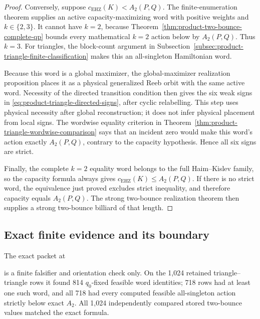 \begin{unverified}
\begin{proof}
Conversely, suppose \(c_{\mathrm{EHZ}}(K)<A_2(P,Q)\).  The finite-enumeration
theorem supplies an active capacity-maximizing word with positive weights and
\(k\in\{2,3\}\).  It cannot have \(k=2\), because
Theorem~\ref{thm:product-two-bounce-complete-qp} bounds every mathematical
\(k=2\) action below by \(A_2(P,Q)\).  Thus \(k=3\).  For triangles, the
block-count argument in
Subsection~\ref{subsec:product-triangle-finite-classification} makes this an
all-singleton Hamiltonian word.

Because this word is a global maximizer, the global-maximizer realization
proposition places it as a physical generalized Reeb orbit with the same
active word.  Necessity of the directed transition condition then gives the
six weak signs in \eqref{eq:product-triangle-directed-signs}, after cyclic
relabelling.  This step uses physical necessity after global reconstruction;
it does not infer physical placement from local signs.  The wordwise equality
criterion in Theorem~\ref{thm:product-triangle-wordwise-comparison} says that
an incident zero would make this word's action exactly \(A_2(P,Q)\), contrary
to the capacity hypothesis.  Hence all six signs are strict.

Finally, the complete \(k=2\) equality word belongs to the full Haim--Kislev
family, so the capacity formula always gives
\(c_{\mathrm{EHZ}}(K)\leq A_2(P,Q)\).  If there is no strict word, the
equivalence just proved excludes strict inequality, and therefore capacity
equals \(A_2(P,Q)\).  The strong two-bounce realization theorem then supplies
a strong two-bounce billiard of that length.
\end{proof}
\end{unverified}

\subsection{Exact finite evidence and its boundary}
\label{subsec:product-triangle-evidence}

The exact packet at
\begin{center}
\end{center}
is a finite falsifier and orientation check only.  On the 1,024 retained
triangle--triangle rows it found 814 \(q_0\)-fixed feasible word identities;
718 rows had at least one such word, and all 718 had every computed feasible
all-singleton action strictly below exact \(A_2\).  All 1,024 independently
compared stored two-bounce values matched the exact formula.

